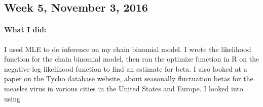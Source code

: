 \documentclass{article}
\begin{document}
\subsection{Week 5, November 3, 2016}
	\paragraph{What I did:}
	I used MLE to do inference on my chain binomial model. I wrote the likelihood function for the chain binomial model, then ran the optimize function in R on the negative log likelihood function to find an estimate for beta. I also looked at a paper on the Tycho database website, about seasonally fluctuation betas for the measles virus in various cities in the United States and Europe. I looked into using 
    
\end{document}
